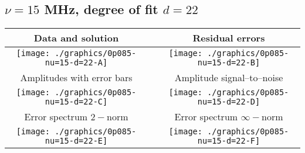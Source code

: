 

% 

\clearpage{}
\break{}

\subsection{$\nu = 15$ MHz, degree of fit $d = 22$}

\begin{table}[h]
    \begin{center}
        \begin{tabular}{ccc}
            Data and solution & \quad & Residual errors \\\hline
            \texttt{[image: ./graphics/0p085-nu=15-d=22-A]} &&
            \texttt{[image: ./graphics/0p085-nu=15-d=22-B]} \\[15pt]
            Amplitudes with error bars && Amplitude signal--to--noise \\\hline
            \texttt{[image: ./graphics/0p085-nu=15-d=22-C]} &&
            \texttt{[image: ./graphics/0p085-nu=15-d=22-D]} \\[15pt]
            Error spectrum $2-$norm && Error spectrum $\infty-$norm \\\hline
            \texttt{[image: ./graphics/0p085-nu=15-d=22-E]} &&
            \texttt{[image: ./graphics/0p085-nu=15-d=22-F]} \\[15pt]
        \end{tabular}
    \end{center}
\label{fig:elev=85, nu=15}
\end{table}



\endinput
